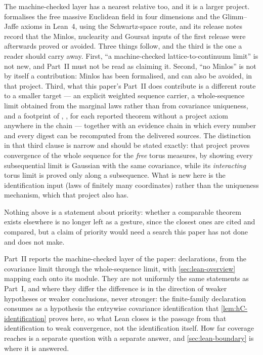 The machine-checked layer has a nearest relative too, and it is a larger
project.  \cite{douglas2026} formalises the free massive Euclidean field in four
dimensions and the Glimm--Jaffe axioms in Lean~4, using the Schwartz-space route,
and its release notes record that the Minlos, nuclearity and Goursat inputs of
the first release were afterwards proved or avoided.  Three things follow, and
the third is the one a reader should carry away.  First, ``a machine-checked
lattice-to-continuum limit'' is not new, and Part~II must not be read as claiming
it.  Second, ``no Minlos'' is not by itself a contribution: Minlos has been
formalised, and can also be avoided, in that project.  Third, what this paper's
Part~II does contribute is a different route to a smaller target --- an explicit
weighted sequence carrier, a whole-sequence limit obtained from the marginal laws
rather than from covariance uniqueness, and a footprint of
, ,  for each reported
theorem without a project axiom anywhere in the chain --- together with an
evidence chain in which every number and every digest can be recomputed from the
delivered sources.  The distinction in that third clause is narrow and should be
stated exactly: that project proves convergence of the whole sequence for the
\emph{free} torus measures, by showing every subsequential limit is Gaussian with
the same covariance, while its \emph{interacting} torus limit is proved only along
a subsequence.  What is new here is the identification input (laws of finitely
many coordinates) rather than the uniqueness mechanism, which that project also
has.

Nothing above is a statement about priority: whether a comparable theorem exists
elsewhere is no longer left as a gesture, since the closest ones are cited and
compared, but a claim of priority would need a search this paper has not done and
does not make.

Part~II reports the machine-checked layer of the paper: \NumChainTheorems{}
declarations, from the covariance limit through the whole-sequence limit, with
\cref{sec:lean-overview} mapping each onto its module.  They are not uniformly
the same statements as Part~I, and where they differ the difference is in the
direction of weaker hypotheses or weaker conclusions, never stronger: the
finite-family declaration consumes as
a hypothesis the entrywise covariance identification that \cref{lem:hC-identification}
proves here, so what Lean closes is the passage from that identification to weak
convergence, not the identification itself.  How far coverage reaches is a
separate question with a separate answer, and \cref{sec:lean-boundary} is where
it is answered.
